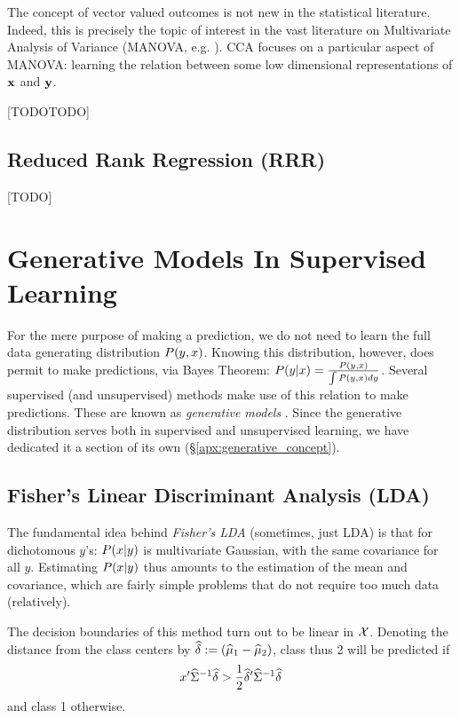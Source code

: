 The concept of vector valued outcomes is not new in the statistical literature. 
Indeed, this is precisely the topic of interest in the vast literature on Multivariate Analysis of Variance (MANOVA, e.g. \cite{anderson_introduction_2003}).
CCA focuses on a particular aspect of MANOVA: learning the relation between some low dimensional representations of $\mathbf{x}$ and $\mathbf{y}$.


[TODOTODO]


\subsection{Reduced Rank Regression (RRR)}
\label{sec:reduced_rank_regression}
[TODO]




\section{Generative Models In Supervised Learning}
\label{sec:generative}

For the mere purpose of making a prediction, we do not need to learn the full data generating distribution $P(y,x)$. 
Knowing this distribution, however, does permit to make predictions, via Bayes Theorem: 
$P(y|x)=\frac{P(y,x)}{\int P(y,x)dy}$.
Several supervised (and unsupervised) methods make use of this relation to make predictions. These are known as \emph{generative models} .
Since the generative distribution serves both in supervised and unsupervised learning, we have dedicated it a section of its own (\S\ref{apx:generative_concept}).



\subsection{Fisher's Linear Discriminant Analysis (LDA)}
\label{sec:lda}

The fundamental idea behind \emph{Fisher's LDA} (sometimes, just LDA) is that for dichotomous $y$'s: $P(x|y)$ is multivariate Gaussian, with the same covariance for all $y$.
Estimating $P(x|y)$ thus amounts to the estimation of the mean and covariance, which are fairly simple problems that do not require too much data (relatively).

The decision boundaries of this method turn out to be linear in $\mathcal{X}$. 
Denoting the distance from the class centers by $\widehat{\delta}:=(\widehat{\mu}_1-\widehat{\mu}_2)$, class thus 2 will be predicted if 
\begin{align}
	x' \widehat{\Sigma}^{-1} \widehat{\delta} > \frac{1}{2} \widehat{\delta}' \widehat{\Sigma}^{-1} \widehat{\delta}
\end{align}
and class 1 otherwise.


